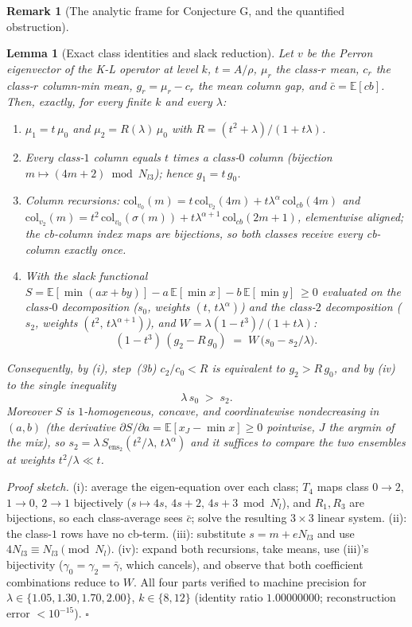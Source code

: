 \documentclass[11pt]{article}
\newtheorem{lemma}[theorem]{Lemma}
\theoremstyle{definition}
\newtheorem{remark}[theorem]{Remark}
\begin{document}
\begin{remark}[The analytic frame for Conjecture G, and the quantified
obstruction]
\begin{lemma}[Exact class identities and slack reduction]\label{lem:exact_reduction}
Let $v$ be the Perron eigenvector of the K-L operator at level $k$, $t=A/\rho$,
$\mu_r$ the class-$r$ mean, $c_r$ the class-$r$ column-min mean, $g_r=\mu_r-c_r$
the mean column gap, and $\bar c=\mathbb{E}[cb]$. Then, exactly, for every finite $k$
and every $\lambda$:
\begin{enumerate}
\item[(i)] $\mu_1=t\,\mu_0$ and $\mu_2 = R(\lambda)\,\mu_0$ with $R=(t^2+\lambda)/(1+t\lambda)$.
\item[(ii)] Every class-$1$ column equals $t$ times a class-$0$ column
  (bijection $m\mapsto (4m{+}2) \bmod N_{l3}$); hence $g_1=t\,g_0$.
\item[(iii)] Column recursions: $\mathrm{col}_{v_0}(m)= t\,\mathrm{col}_{v_2}(4m)
  + t\lambda^{\alpha}\,\mathrm{col}_{cb}(4m)$ and
  $\mathrm{col}_{v_2}(m)= t^2\,\mathrm{col}_{v_0}(\sigma(m))
  + t\lambda^{\alpha+1}\,\mathrm{col}_{cb}(2m{+}1)$, elementwise aligned; the cb-column
  index maps are bijections, so both classes receive every cb-column exactly once.
\item[(iv)] With the slack functional
  $S = \mathbb{E}[\min(ax+by)] - a\,\mathbb{E}[\min x] - b\,\mathbb{E}[\min y]\ \ge 0$
  evaluated on the class-$0$ decomposition ($s_0$, weights $(t,\,t\lambda^\alpha)$) and the
  class-$2$ decomposition ($s_2$, weights $(t^2,\,t\lambda^{\alpha+1})$), and
  $W=\lambda(1-t^3)/(1+t\lambda)$:
  \[
    (1-t^3)\,(g_2 - R\,g_0) \;=\; W\,\bigl(s_0 - s_2/\lambda\bigr).
  \]
\end{enumerate}
Consequently, by (i), step~(3b) $c_2/c_0<R$ is \emph{equivalent} to $g_2>R\,g_0$, and by (iv)
to the single inequality
\[
  \boxed{\;\lambda\, s_0 \;>\; s_2.\;}
\]
Moreover $S$ is $1$-homogeneous, concave, and coordinatewise nondecreasing in $(a,b)$
(the derivative $\partial S/\partial a = \mathbb{E}[x_J-\min x]\ge 0$ pointwise, $J$ the
argmin of the mix), so $s_2 = \lambda\,S_{\mathrm{ens}_2}(t^2/\lambda,\, t\lambda^\alpha)$
and it suffices to compare the two ensembles at weights $t^2/\lambda \ll t$.
\end{lemma}

\emph{Proof sketch.} (i): average the eigen-equation over each class; $T_4$ maps class
$0\to2$, $1\to0$, $2\to1$ bijectively ($s\mapsto 4s,\,4s{+}2,\,4s{+}3 \bmod N_l$), and
$R_1,R_3$ are bijections, so each class-average sees $\bar c$; solve the resulting
$3\times3$ linear system. (ii): the class-$1$ rows have no cb-term. (iii): substitute
$s=m+eN_{l3}$ and use $4N_{l3}\equiv N_{l3} \pmod{N_l}$. (iv): expand both recursions,
take means, use (iii)'s bijectivity ($\gamma_0=\gamma_2=\bar\gamma$, which cancels), and
observe that both coefficient combinations reduce to $W$. All four parts verified to
machine precision for $\lambda\in\{1.05,1.30,1.70,2.00\}$, $k\in\{8,12\}$
(identity ratio $1.00000000$; reconstruction error $<10^{-15}$). $\square$


\end{remark}
\end{document}
